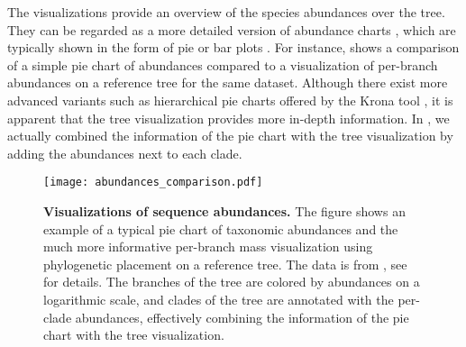 The visualizations provide an overview of the species abundances over the tree.
They can be regarded as a more detailed version of abundance charts \cite{Huttenhower2012},
which are typically shown in the form of pie or bar plots \cite{Mahe2017,Lentendu2018}.
For instance,  shows a comparison of a simple pie chart of abundances
compared to a visualization of per-branch abundances on a reference tree for the same dataset.
Although there exist more advanced variants such as hierarchical pie charts offered by the Krona tool \cite{Ondov2011},
it is apparent that the tree visualization provides more in-depth information.
In , we actually combined the information of the pie chart
with the tree visualization by adding the abundances next to each clade.

\begin{figure}[!ht]
    \centering
    \texttt{[image: abundances\_comparison.pdf]}
    \begin{subfigure}{0pt}
        \label{fig:abundances_comparison:sub:pie_chart}
    \end{subfigure}
    \begin{subfigure}{0pt}
        \label{fig:abundances_comparison:sub:branch_colors}
    \end{subfigure}
    \caption[Visualizations of sequence abundances]{
        \textbf{Visualizations of sequence abundances.}
        The figure shows an example of
         a typical pie chart of taxonomic abundances and
         the much more informative per-branch mass visualization
        using phylogenetic placement on a reference tree.
        The data is from \cite{Mahe2017}, see  for details.
        The branches of the tree are colored by abundances on a logarithmic scale,
        and clades of the tree are annotated with the per-clade abundances,
        effectively combining the information of the pie chart with the tree visualization.
    }
    \label{fig:abundances_comparison}
\end{figure}

